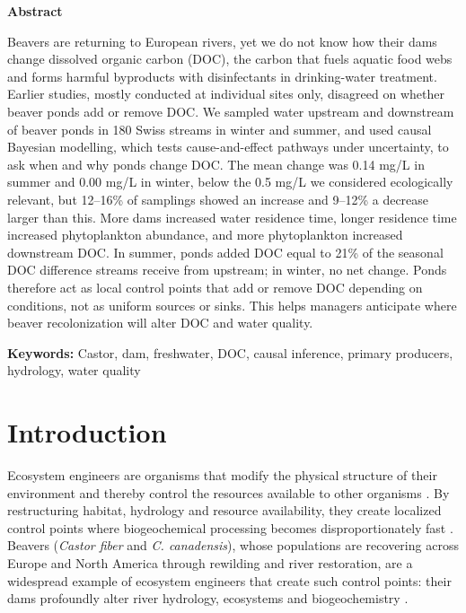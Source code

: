 \documentclass[pdflatex,sn-nature]{sn-jnl}   %
\begin{document}
\clearpage
\noindent\textbf{Abstract}\par\smallskip
\noindent Beavers are returning to European rivers, yet we do not know how their dams change dissolved organic carbon (DOC), the carbon that fuels aquatic food webs and forms harmful byproducts with disinfectants in drinking-water treatment. Earlier studies, mostly conducted at individual sites only, disagreed on whether beaver ponds add or remove DOC. We sampled water upstream and downstream of beaver ponds in 180 Swiss streams in winter and summer, and used causal Bayesian modelling, which tests cause-and-effect pathways under uncertainty, to ask when and why ponds change DOC. The mean change was 0.14 mg/L in summer and 0.00 mg/L in winter, below the 0.5 mg/L we considered ecologically relevant, but 12--16\% of samplings showed an increase and 9--12\% a decrease larger than this. More dams increased water residence time, longer residence time increased phytoplankton abundance, and more phytoplankton increased downstream DOC. In summer, ponds added DOC equal to 21\% of the seasonal DOC difference streams receive from upstream; in winter, no net change. Ponds therefore act as local control points that add or remove DOC depending on conditions, not as uniform sources or sinks. This helps managers anticipate where beaver recolonization will alter DOC and water quality.\par\medskip
\noindent\textbf{Keywords:} Castor, dam, freshwater, DOC, causal inference, primary producers, hydrology, water quality
\clearpage

\section{Introduction}

Ecosystem engineers are organisms that modify the physical structure of their environment and thereby control the resources available to other organisms \cite{jones1994}. By restructuring habitat, hydrology and resource availability, they create localized control points where biogeochemical processing becomes disproportionately fast \cite{bernhardt2017,laudon2026}. Beavers (\emph{Castor fiber} and \emph{C. canadensis}), whose populations are recovering across Europe and North America through rewilding and river restoration, are a widespread example of ecosystem engineers that create such control points: their dams profoundly alter river hydrology, ecosystems and biogeochemistry \cite{larsen2021,grudzinski2022}.
\end{document}

